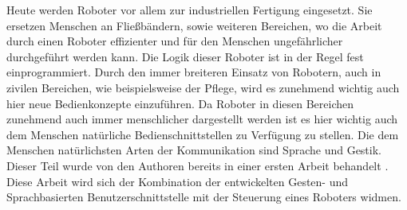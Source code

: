 Heute werden Roboter vor allem zur industriellen Fertigung eingesetzt. Sie ersetzen Menschen an Fließb\"andern, sowie weiteren Bereichen, wo die Arbeit durch einen Roboter effizienter und f\"ur den Menschen ungef\"ahrlicher durchgef\"uhrt werden kann. Die Logik dieser Roboter ist in der Regel fest einprogrammiert. Durch den immer breiteren Einsatz von Robotern, auch in zivilen Bereichen, wie beispielsweise der Pflege, wird es zunehmend wichtig auch hier neue Bedienkonzepte einzuf\"uhren. Da Roboter in diesen Bereichen zunehmend auch immer menschlicher dargestellt werden ist es hier wichtig auch dem Menschen nat\"urliche Bedienschnittstellen zu Verf\"ugung zu stellen. Die dem Menschen nat\"urlichsten Arten der Kommunikation sind Sprache und Gestik. Dieser Teil wurde von den Authoren bereits in einer ersten Arbeit behandelt \cite{bib:Ebner_Werling}. Diese Arbeit wird sich der Kombination der entwickelten Gesten- und Sprachbasierten Benutzerschnittstelle mit der Steuerung eines Roboters widmen.



